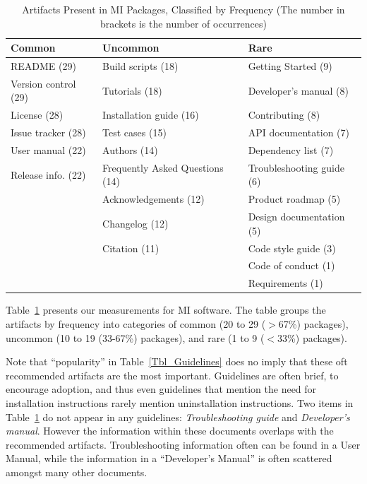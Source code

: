\documentclass[final, 12pt, 3p, times]{elsarticle}
\begin{document}
\begin{table}[!ht]
    \begin{center}
    \begin{tabular}{ p{3.8 cm} p{6.4 cm} p{4.5 cm}}
    \toprule
    Common & Uncommon & Rare \\
    \midrule
    README (29) & Build scripts (18) & Getting Started (9)\\
    Version control (29) & Tutorials (18) & Developer's manual (8)\\
    License (28) & Installation guide (16) & Contributing (8)\\
    Issue tracker (28) & Test cases (15) & API documentation (7)\\
    User manual (22) & Authors (14) & Dependency list (7)\\
    Release info. (22) & Frequently Asked Questions (14) & Troubleshooting guide (6)\\
     & Acknowledgements (12) & Product roadmap (5)\\
     & Changelog (12) & Design documentation (5)\\
     & Citation (11) & Code style guide (3)\\
     & & Code of conduct (1)\\
     & & Requirements (1)\\
    \bottomrule
    \end{tabular}
    \caption{Artifacts Present in MI Packages, Classified by Frequency (The number 
    in brackets is the number of occurrences)}
    \label{artifactspresent}
    \end{center}
\end{table}

Table~\ref{artifactspresent} presents our measurements for MI software.
The table groups the artifacts by frequency
into categories of common (20 to 29 ($>$67\%) packages), uncommon (10 to 19
(33-67\%) packages), and rare (1 to 9 ($<$33\%) packages).

Note that ``popularity'' in Table~\ref{Tbl_Guidelines} does no imply that these
oft recommended artifacts are the most important. Guidelines are often brief,
to encourage adoption, and thus even guidelines that mention the need for
installation instructions rarely mention uninstallation instructions.
Two items in Table~\ref{artifactspresent} do not appear in any guidelines:
\emph{Troubleshooting guide} and \emph{Developer's manual}.  However the
information within these documents overlaps with
the recommended artifacts.  Troubleshooting information often can be found in
a User Manual, while the information in a ``Developer's Manual'' is often
scattered amongst many other documents.
\end{document}
